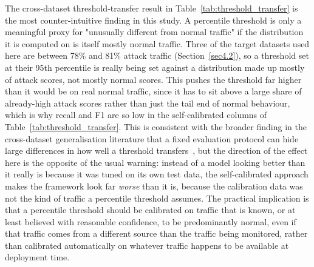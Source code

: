 \documentclass[futureinternet,article,submit,moreauthors]{Definitions/mdpi}
\begin{document}
The cross-dataset threshold-transfer result in Table~\ref{tab:threshold_transfer} is the most counter-intuitive finding in this study. A percentile threshold is only a meaningful proxy for "unusually different from normal traffic" if the distribution it is computed on is itself mostly normal traffic. Three of the target datasets used here are between 78\% and 81\% attack traffic (Section~\ref{sec4.2}), so a threshold set at their 95th percentile is really being set against a distribution made up mostly of attack scores, not mostly normal scores. This pushes the threshold far higher than it would be on real normal traffic, since it has to sit above a large share of already-high attack scores rather than just the tail end of normal behaviour, which is why recall and F1 are so low in the self-calibrated columns of Table~\ref{tab:threshold_transfer}. This is consistent with the broader finding in the cross-dataset generalisation literature that a fixed evaluation protocol can hide large differences in how well a threshold transfers~\cite{cantone2024}, but the direction of the effect here is the opposite of the usual warning: instead of a model looking better than it really is because it was tuned on its own test data, the self-calibrated approach makes the framework look far \emph{worse} than it is, because the calibration data was not the kind of traffic a percentile threshold assumes. The practical implication is that a percentile threshold should be calibrated on traffic that is known, or at least believed with reasonable confidence, to be predominantly normal, even if that traffic comes from a different source than the traffic being monitored, rather than calibrated automatically on whatever traffic happens to be available at deployment time.
\end{document}
